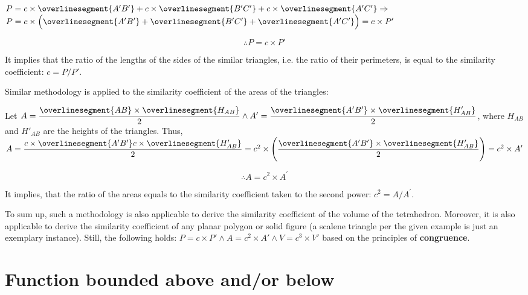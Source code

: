\documentclass[10pt,a4paper]{article}
\begin{document}
$P = c \times \overlinesegment{A'B'} + c \times \overlinesegment{B'C'} + c 
\times \overlinesegment{A'C'} \Rightarrow$
$P = c \times \Big( \overlinesegment{A'B'} + \overlinesegment{B'C'} + \overlinesegment{A'C'} \Big) = c \times P'$

$$\therefore P = c \times P'$$

It implies that the ratio of the lengths of the sides of the similar triangles,
i.e. the ratio of their perimeters, is equal to the similarity coefficient:
$c = {P}/{P'}$.

Similar methodology is applied to the similarity coefficient of the areas of the triangles:

Let $A = \dfrac{\overlinesegment{AB} \times \overlinesegment{H_{AB}}}{2} \land 
A' = \dfrac{\overlinesegment{A'B'} \times \overlinesegment{H'_{AB}}}{2}$,
where $H_{AB}$ and $H'_{AB}$ are the heights of the triangles. Thus,
$A = \dfrac{c \times \overlinesegment{A'B'} c \times \overlinesegment{H'_{AB}}}{2} = 
c^2 \times \Bigg( \dfrac{\overlinesegment{A'B'} 
\times \overlinesegment{H'_{AB}}}{2} \Bigg) = c^2 \times A'$

$$\therefore A = c^2 \times A^{\prime}$$

It implies, that the ratio of the areas equals to the similarity coefficient
taken to the second power: $c^2 = {A}/{A^{\prime}}$.

To sum up, such a methodology is also applicable to derive the similarity coefficient 
of the volume of the tetrahedron. Moreover, it is also applicable to derive the similarity coefficient
of any planar polygon or solid figure (a scalene triangle per the given example is just an exemplary instance). 
Still, the following holds: $P = c \times P' \land A = c^2 \times A' \land V = c^3 \times V'$ 
based on the principles of \textbf{congruence}.


\section*{Function bounded above and/or below}

\end{document}
